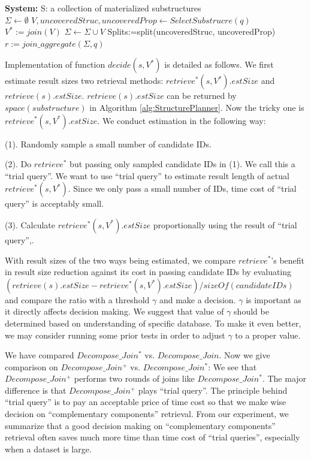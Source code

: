 \begin{algorithm}[H]
\caption{$Decompose\_Join^{+}$}
\LinesNumbered
\textbf{System:} S: a collection of materialized substructures\\ 
$\Sigma \gets \emptyset $\;
$V, uncoveredStruc, uncoveredProp \gets SelectSubstrucre(q) $\;
$V^{*}:=join(V)$\;
$\Sigma \gets \Sigma \cup V $\;
Splits:=split(uncoveredStruc, uncoveredProp)\;
$r := join\_aggregate(\Sigma, q)$\;
\end{algorithm}

Implementation of function $decide(s,V^{*})$ is detailed as follows. We first estimate result sizes two retrieval methods: $retrieve^{*}(s, V^{*}).estSize$ and $retrieve(s).estSize$. $retrieve(s).estSize$ can be returned by $space(substructure)$ in Algorithm \ref{alg:StructurePlanner}. Now the tricky one is $retrieve^{*}(s, V^{*}).estSize$. We conduct estimation in the following way:

(1). Randomly sample a small number of candidate IDs.  

(2). Do $retrieve^{*}$ but passing only sampled candidate IDs in (1). We call this a ``trial query''. We want to use ``trial query'' to estimate result length of actual $retrieve^{*}(s, V^{*})$. Since we only pass a small number of IDs, time cost of ``trial query'' is acceptably small.

(3). Calculate $retrieve^{*}(s, V^{*}).estSize$ proportionally using the result of ``trial query'',.
\par
With result sizes of the two ways being estimated, we compare $retrieve^{*}$'s benefit in result size reduction against its cost in passing candidate IDs by evaluating $(retrieve(s).estSize - retrieve^{*}(s, V^{*}).estSize) / sizeOf(candidateIDs)$ and compare the ratio with a threshold $\gamma$ and make a decision. $\gamma$ is important as it directly affects decision making. We suggest that value of $\gamma$ should be determined based on understanding of specific database. To make it even better, we may consider running some prior tests in order to adjust $\gamma$ to a proper value.

We have compared $Decompose\_Join^{*}$ vs.  $Decompose\_Join$. Now we give comparison on $Decompose\_Join^{+}$ vs. $Decompose\_Join^{*}$: We see that $Decompose\_Join^{+}$ performs two rounds of joins like $Decompose\_Join^{*}$. The major difference is that $Decompose\_Join^{+}$ plays ``trial query''. The principle behind ``trial query'' is to pay an acceptable price of time cost so that we make wise decision on ``complementary components'' retrieval. From our experiment, we summarize that a good decision making on ``complementary components'' retrieval often saves much more time than time cost of ``trial queries'', especially when a dataset is large. 




